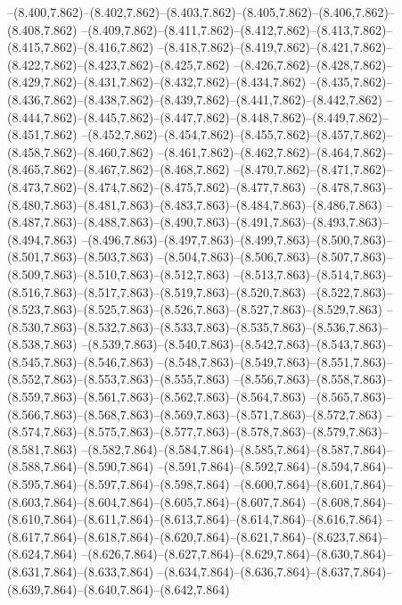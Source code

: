   --(8.400,7.862)--(8.402,7.862)--(8.403,7.862)--(8.405,7.862)--(8.406,7.862)--(8.408,7.862)%
  --(8.409,7.862)--(8.411,7.862)--(8.412,7.862)--(8.413,7.862)--(8.415,7.862)--(8.416,7.862)%
  --(8.418,7.862)--(8.419,7.862)--(8.421,7.862)--(8.422,7.862)--(8.423,7.862)--(8.425,7.862)%
  --(8.426,7.862)--(8.428,7.862)--(8.429,7.862)--(8.431,7.862)--(8.432,7.862)--(8.434,7.862)%
  --(8.435,7.862)--(8.436,7.862)--(8.438,7.862)--(8.439,7.862)--(8.441,7.862)--(8.442,7.862)%
  --(8.444,7.862)--(8.445,7.862)--(8.447,7.862)--(8.448,7.862)--(8.449,7.862)--(8.451,7.862)%
  --(8.452,7.862)--(8.454,7.862)--(8.455,7.862)--(8.457,7.862)--(8.458,7.862)--(8.460,7.862)%
  --(8.461,7.862)--(8.462,7.862)--(8.464,7.862)--(8.465,7.862)--(8.467,7.862)--(8.468,7.862)%
  --(8.470,7.862)--(8.471,7.862)--(8.473,7.862)--(8.474,7.862)--(8.475,7.862)--(8.477,7.863)%
  --(8.478,7.863)--(8.480,7.863)--(8.481,7.863)--(8.483,7.863)--(8.484,7.863)--(8.486,7.863)%
  --(8.487,7.863)--(8.488,7.863)--(8.490,7.863)--(8.491,7.863)--(8.493,7.863)--(8.494,7.863)%
  --(8.496,7.863)--(8.497,7.863)--(8.499,7.863)--(8.500,7.863)--(8.501,7.863)--(8.503,7.863)%
  --(8.504,7.863)--(8.506,7.863)--(8.507,7.863)--(8.509,7.863)--(8.510,7.863)--(8.512,7.863)%
  --(8.513,7.863)--(8.514,7.863)--(8.516,7.863)--(8.517,7.863)--(8.519,7.863)--(8.520,7.863)%
  --(8.522,7.863)--(8.523,7.863)--(8.525,7.863)--(8.526,7.863)--(8.527,7.863)--(8.529,7.863)%
  --(8.530,7.863)--(8.532,7.863)--(8.533,7.863)--(8.535,7.863)--(8.536,7.863)--(8.538,7.863)%
  --(8.539,7.863)--(8.540,7.863)--(8.542,7.863)--(8.543,7.863)--(8.545,7.863)--(8.546,7.863)%
  --(8.548,7.863)--(8.549,7.863)--(8.551,7.863)--(8.552,7.863)--(8.553,7.863)--(8.555,7.863)%
  --(8.556,7.863)--(8.558,7.863)--(8.559,7.863)--(8.561,7.863)--(8.562,7.863)--(8.564,7.863)%
  --(8.565,7.863)--(8.566,7.863)--(8.568,7.863)--(8.569,7.863)--(8.571,7.863)--(8.572,7.863)%
  --(8.574,7.863)--(8.575,7.863)--(8.577,7.863)--(8.578,7.863)--(8.579,7.863)--(8.581,7.863)%
  --(8.582,7.864)--(8.584,7.864)--(8.585,7.864)--(8.587,7.864)--(8.588,7.864)--(8.590,7.864)%
  --(8.591,7.864)--(8.592,7.864)--(8.594,7.864)--(8.595,7.864)--(8.597,7.864)--(8.598,7.864)%
  --(8.600,7.864)--(8.601,7.864)--(8.603,7.864)--(8.604,7.864)--(8.605,7.864)--(8.607,7.864)%
  --(8.608,7.864)--(8.610,7.864)--(8.611,7.864)--(8.613,7.864)--(8.614,7.864)--(8.616,7.864)%
  --(8.617,7.864)--(8.618,7.864)--(8.620,7.864)--(8.621,7.864)--(8.623,7.864)--(8.624,7.864)%
  --(8.626,7.864)--(8.627,7.864)--(8.629,7.864)--(8.630,7.864)--(8.631,7.864)--(8.633,7.864)%
  --(8.634,7.864)--(8.636,7.864)--(8.637,7.864)--(8.639,7.864)--(8.640,7.864)--(8.642,7.864)%
